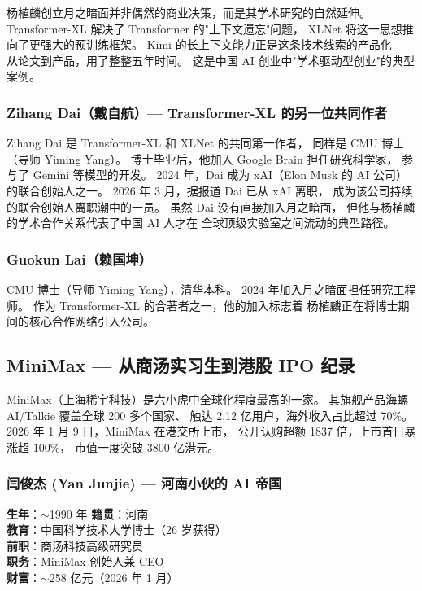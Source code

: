 \begin{whybox}
杨植麟创立月之暗面并非偶然的商业决策，而是其学术研究的自然延伸。
Transformer-XL 解决了 Transformer 的"上下文遗忘"问题，
XLNet 将这一思想推向了更强大的预训练框架。
Kimi 的长上下文能力正是这条技术线索的产品化——
从论文到产品，用了整整五年时间。
这是中国 AI 创业中"学术驱动型创业"的典型案例。
\end{whybox}

\subsubsection{Zihang Dai（戴自航）— Transformer-XL 的另一位共同作者}

Zihang Dai 是 Transformer-XL 和 XLNet 的共同第一作者，
同样是 CMU 博士（导师 Yiming Yang）。
博士毕业后，他加入 Google Brain 担任研究科学家，
参与了 Gemini 等模型的开发。
2024 年，Dai 成为 xAI（Elon Musk 的 AI 公司）的联合创始人之一。
2026 年 3 月，据报道 Dai 已从 xAI 离职，
成为该公司持续的联合创始人离职潮中的一员。
虽然 Dai 没有直接加入月之暗面，
但他与杨植麟的学术合作关系代表了中国 AI 人才在
全球顶级实验室之间流动的典型路径。

\subsubsection{Guokun Lai（赖国坤）}

CMU 博士（导师 Yiming Yang），清华本科。
2024 年加入月之暗面担任研究工程师。
作为 Transformer-XL 的合著者之一，他的加入标志着
杨植麟正在将博士期间的核心合作网络引入公司。


\subsection{MiniMax — 从商汤实习生到港股 IPO 纪录}

MiniMax（上海稀宇科技）是六小虎中全球化程度最高的一家。
其旗舰产品海螺 AI/Talkie 覆盖全球 200 多个国家、
触达 2.12 亿用户，海外收入占比超过 70\%。
2026 年 1 月 9 日，MiniMax 在港交所上市，
公开认购超额 1837 倍，上市首日暴涨超 100\%，
市值一度突破 3800 亿港元。

\subsubsection{闫俊杰 (Yan Junjie) — 河南小伙的 AI 帝国}

\begin{keybox}
\textbf{生年}：$\sim$1990 年 \quad \textbf{籍贯}：河南 \\
\textbf{教育}：中国科学技术大学博士（26 岁获得） \\
\textbf{前职}：商汤科技高级研究员 \\
\textbf{职务}：MiniMax 创始人兼 CEO \\
\textbf{财富}：$\sim$258 亿元（2026 年 1 月）
\end{keybox}

